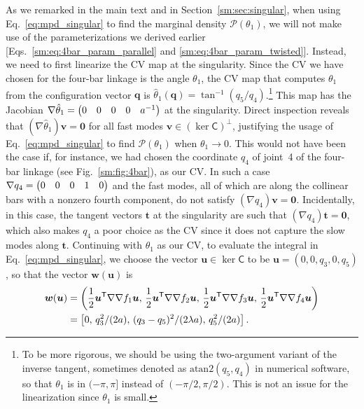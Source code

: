 As we remarked in the main text and in Section~\ref{sm:sec:singular}, when using Eq.~\eqref{eq:mpd_singular} to find the marginal density $\mathscr{P}(\mathscr{\theta}_{1})$, we will not make use of the parameterizations we derived earlier [Eqs.~\eqref{sm:eq:4bar_param_parallel} and \eqref{sm:eq:4bar_param_twisted}].
Instead, we need to first linearize the CV map at the singularity.
Since the CV we have chosen for the four-bar linkage is the angle $\theta_{1}$, the CV map that computes $\theta_{1}$ from the configuration vector $\bm{q}$ is $\hat{\theta}_{1}(\bm{q}) = \tan^{-1}(q_{5}/q_{4})$.\footnote{To be more rigorous, we should be using the two-argument variant of the inverse tangent, sometimes denoted as $\mathrm{atan2}(q_{5},q_{4})$ in numerical software, so that $\theta_{1}$ is in $(-\pi, \pi]$ instead of $(-\pi/2,\pi/2)$.  This is not an issue for the linearization since $\theta_{1}$ is small.}
This map has the Jacobian $\nabla\hat{\theta}_1 = \begin{pmatrix}0 & 0 & 0 & 0 & a^{-1}\end{pmatrix}$ at the singularity.
Direct inspection reveals that $(\nabla\hat{\theta}_{1})\bm{v} = \bm{0}$ for all fast modes $\bm{v} \in (\ker\mathsf{C})^{\perp}$, justifying the usage of Eq.~\eqref{eq:mpd_singular} to find $\mathscr{P}(\mathscr{\theta}_{1})$ when $\theta_{1} \to 0$.
This would not have been the case if, for instance, we had chosen the coordinate $q_{4}$ of joint~4 of the four-bar linkage (see Fig.~\ref{sm:fig:4bar}), as our CV.
In such a case $\nabla{q_{4}} = \begin{pmatrix}0 & 0 & 0 & 1 & 0\end{pmatrix}$ and the fast modes, all of which are along the collinear bars with a nonzero fourth component, do not satisfy $(\nabla q_{4})\bm{v} = \bm{0}$.
Incidentally, in this case, the tangent vectors $\bm{t}$ at the singularity are such that $(\nabla q_{4})\bm{t} = \bm{0}$, which also makes $q_{4}$ a poor choice as the CV since it does not capture the slow modes along $\bm{t}$.
Continuing with $\theta_{1}$ as our CV, to evaluate the integral in Eq.~\eqref{eq:mpd_singular}, we choose the vector $\bm{u} \in \ker \mathsf{C}$ to be $\bm{u} = (0, 0, q_3, 0, q_{5})$, so that the vector $\bm{w}(\bm{u})$ is
%
\begin{equation}
  \begin{aligned}
    \bm{w}(\bm{u}) &= \left(\frac{1}{2}\bm{u}^\mathsf{T} \nabla\nabla f_1 \bm{u},\, \frac{1}{2}\bm{u}^\mathsf{T}\nabla\nabla f_2\bm{u},\, \frac{1}{2}\bm{u}^\mathsf{T}\nabla\nabla f_3\bm{u},\, \frac{1}{2}\bm{u}^\mathsf{T}\nabla\nabla f_4\bm{u} \right)\\
      &= \left[0,\,q_3^2/(2a),\,(q_3-q_5)^2/(2\lambda a),\,q_5^2/(2a)\right].
  \end{aligned}
  \label{sm:eq:4bar_w}
\end{equation}

